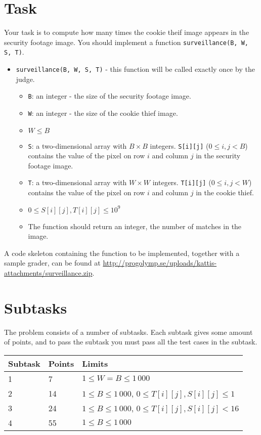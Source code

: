 \section*{Task}
Your task is to compute how many times the cookie theif image appears in the security footage image.
You should implement a function \texttt{surveillance(B, W, S, T)}.
\begin{itemize}
  \item \texttt{surveillance(B, W, S, T)} - this function will be called exactly once by the judge.
  \begin{itemize}
    \item \texttt{B}: an integer - the size of the security footage image.
    \item \texttt{W}: an integer - the size of the cookie thief image.
    \item $W \le B$
    \item \texttt{S}: a two-dimensional array with $B \times B$ integers. \texttt{S[i][j]} ($0 \le i, j < B$) contains the value of the pixel on row $i$ and column $j$ in the security footage image.
    \item \texttt{T}: a two-dimensional array with $W \times W$ integers. \texttt{T[i][j]} ($0 \le i, j < W$) contains the value of the pixel on row $i$ and column $j$ in the cookie thief.
    \item $0 \le S[i][j], T[i][j] \le 10^9$
    \item The function should return an integer, the number of matches in the image.
  \end{itemize}
\end{itemize}

A code skeleton containing the function to be implemented, together with a sample grader, can be found at
\url{http://progolymp.se/uploads/kattis-attachments/surveillance.zip}.

\section*{Subtasks}
The problem consists of a number of subtasks. Each subtask gives some amount of points, and to pass
the subtask you must pass all the test cases in the subtask.

\begin{tabular}{|l|l|l|}
  \hline
  \textbf{Subtask} & \textbf{Points} & \textbf{Limits} \\ \hline
  1 & 7 & $1 \le W = B \le 1\,000$  \\ \hline

  2 & 14 & $1 \le B \le 1\,000$, $0 \le T[i][j], S[i][j] \le 1$ \\ \hline

  3 & 24 & $1 \le B \le 1\,000$, $0 \le T[i][j], S[i][j] < 16$ \\ \hline

  4 & 55 & $1 \le B \le 1\,000$ \\ \hline

\end{tabular}

